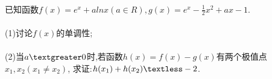 \documentclass[UTF8]{ctexart}
\begin{document}
\paragraph{} \kaishu{}已知函数$f(x)=e^{x}+aln{x} (a \in R), g(x)=e^{x}-\frac{1}{2}x^{2}+ax-1$.
\paragraph{} (1)讨论$f(x)$的单调性;
\paragraph{} (2)当$a \textgreater 0$时,若函数$h(x)=f(x)-g(x)$有两个极值点$x_{1},x_{2}(x_{1}\neq x_{2})$,
求证:$h(x_{1})+h(x_{2})\textless-2$.
\end{document}
